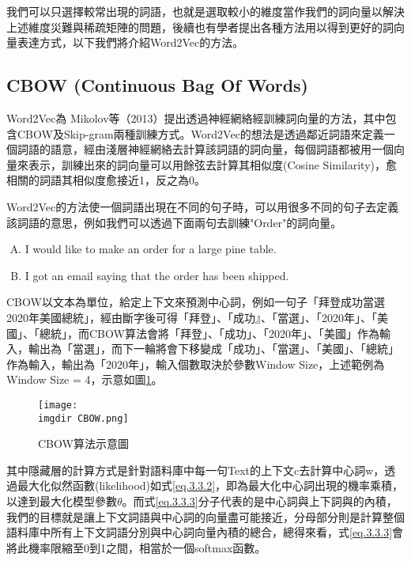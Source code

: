 	我們可以只選擇較常出現的詞語，也就是選取較小的維度當作我們的詞向量以解決上述維度災難與稀疏矩陣的問題，後續也有學者提出各種方法用以得到更好的詞向量表達方式，以下我們將介紹Word2Vec的方法。
	
\subsection{CBOW (Continuous Bag Of Words)}
	Word2Vec為 Mikolov等（2013）提出透過神經網絡經訓練詞向量的方法，其中包含CBOW及Skip-gram兩種訓練方式。Word2Vec的想法是透過鄰近詞語來定義一個詞語的語意，經由淺層神經網絡去計算該詞語的詞向量，每個詞語都被用一個向量來表示，訓練出來的詞向量可以用餘弦去計算其相似度(Cosine Similarity)，愈相關的詞語其相似度愈接近1，反之為0。
	
	Word2Vec的方法使一個詞語出現在不同的句子時，可以用很多不同的句子去定義該詞語的意思，例如我們可以透過下面兩句去訓練"Order"的詞向量。

\begin{enumerate}[A.]
\setlength{\itemsep}{-10pt}
\item I would like to make an order for a large pine table. 
\item I got an email saying that the order has been shipped.

\end{enumerate}	
	
	CBOW以文本為單位，給定上下文來預測中心詞，例如一句子「拜登成功當選2020年美國總統」，經由斷字後可得「拜登」、「成功』、「當選」、「2020年」、「美國」、「總統」，而CBOW算法會將「拜登」、「成功」、「2020年」、「美國」作為輸入，輸出為「當選」，而下一輪將會下移變成「成功」、「當選」、「美國」、「總統」作為輸入，輸出為「2020年」，輸入個數取決於參數Window Size，上述範例為 Window Size = 4，示意如圖\ref{grap.3.3.2}。
	
\begin{figure}[H]
    \centering
        \texttt{[image: \\imgdir CBOW.png]}
    \caption{CBOW算法示意圖}
    \label{grap.3.3.2}
\end{figure}
	
	其中隱藏層的計算方式是針對語料庫中每一句Text的上下文c去計算中心詞w，透過最大化似然函數(likelihood)如式\ref{eq.3.3.2}，即為最大化中心詞出現的機率乘積，以達到最大化模型參數$\theta$。而式\ref{eq.3.3.3}分子代表的是中心詞與上下詞與的內積，我們的目標就是讓上下文詞語與中心詞的向量盡可能接近，分母部分則是計算整個語料庫中所有上下文詞語分別與中心詞向量內積的總合，總得來看，式\ref{eq.3.3.3}會將此機率限縮至0到1之間，相當於一個softmax函數。
	
